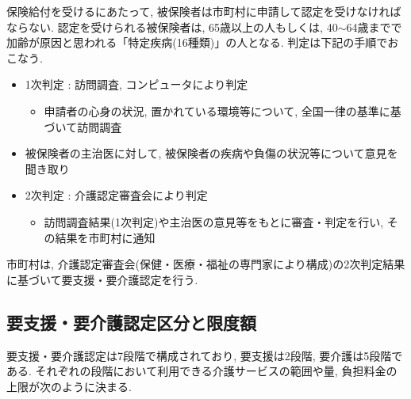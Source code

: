 保険給付を受けるにあたって, 被保険者は市町村に申請して認定を受けなければならない.
認定を受けられる被保険者は, 65歳以上の人もしくは, 40$\sim$64歳までで加齢が原因と思われる「特定疾病(16種類)」の人となる.
判定は下記の手順でおこなう.
\begin{itemize} \setlength{\itemsep}{-0.5mm} \setlength{\parskip}{-0.5mm}
	\item 1次判定  :  訪問調査, コンピュータにより判定
	      \begin{itemize} \setlength{\itemsep}{-0.5mm} \setlength{\parskip}{-0.5mm}
		      \item 申請者の心身の状況, 置かれている環境等について, 全国一律の基準に基づいて訪問調査
	      \end{itemize}
	\item 被保険者の主治医に対して, 被保険者の疾病や負傷の状況等について意見を聞き取り
	\item 2次判定  :  介護認定審査会により判定
	      \begin{itemize} \setlength{\itemsep}{-0.5mm} \setlength{\parskip}{-0.5mm}
		      \item 訪問調査結果(1次判定)や主治医の意見等をもとに審査・判定を行い, その結果を市町村に通知
	      \end{itemize}
\end{itemize}
市町村は, 介護認定審査会(保健・医療・福祉の専門家により構成)の2次判定結果に基づいて要支援・要介護認定を行う.

\subsection{要支援・要介護認定区分と限度額}
要支援・要介護認定は7段階で構成されており,  要支援は2段階, 要介護は5段階である.
それぞれの段階において利用できる介護サービスの範囲や量, 負担料金の上限が次のように決まる.

